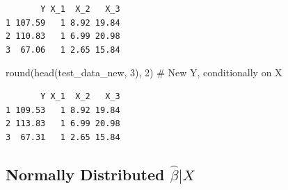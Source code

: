\documentclass[
  letterpaper,
  DIV=11,
  numbers=noendperiod]{scrreprt}
\newenvironment{Shaded}{\begin{snugshade}}{\end{snugshade}}
\newcommand{\AttributeTok}[1]{\textcolor[rgb]{0.40,0.45,0.13}{#1}}
\newcommand{\CommentTok}[1]{\textcolor[rgb]{0.37,0.37,0.37}{#1}}
\newcommand{\DecValTok}[1]{\textcolor[rgb]{0.68,0.00,0.00}{#1}}
\newcommand{\DocumentationTok}[1]{\textcolor[rgb]{0.37,0.37,0.37}{\textit{#1}}}
\newcommand{\FunctionTok}[1]{\textcolor[rgb]{0.28,0.35,0.67}{#1}}
\newcommand{\NormalTok}[1]{\textcolor[rgb]{0.00,0.23,0.31}{#1}}
\newcommand{\OtherTok}[1]{\textcolor[rgb]{0.00,0.23,0.31}{#1}}
\newcommand{\SpecialCharTok}[1]{\textcolor[rgb]{0.37,0.37,0.37}{#1}}
\theoremstyle{definition}
\theoremstyle{plain}
\theoremstyle{plain}
\theoremstyle{remark}
\begin{document}
\begin{Shaded}
\end{Shaded}

\begin{verbatim}
       Y X_1  X_2   X_3
1 107.59   1 8.92 19.84
2 110.83   1 6.99 20.98
3  67.06   1 2.65 15.84
\end{verbatim}

\begin{Shaded}
\begin{Highlighting}[]
\FunctionTok{round}\NormalTok{(}\FunctionTok{head}\NormalTok{(test\_data\_new, }\DecValTok{3}\NormalTok{), }\DecValTok{2}\NormalTok{) }\CommentTok{\# New Y, conditionally on X}
\end{Highlighting}
\end{Shaded}

\begin{verbatim}
       Y X_1  X_2   X_3
1 109.53   1 8.92 19.84
2 113.83   1 6.99 20.98
3  67.31   1 2.65 15.84
\end{verbatim}

\hypertarget{normally-distributed-hatbetax}{%
\subsection{\texorpdfstring{Normally Distributed
\(\hat\beta|X\)}{Normally Distributed \textbackslash hat\textbackslash beta\textbar X}}\label{normally-distributed-hatbetax}}
\end{document}
